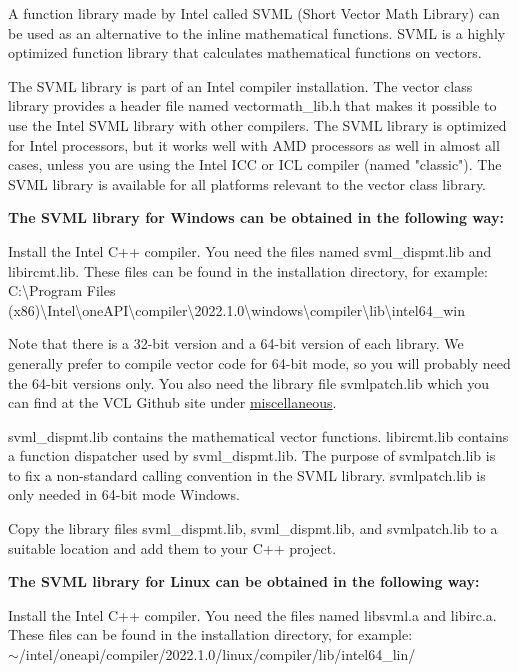 \documentclass[vcl_manual.tex]{subfiles}
\begin{document}
A function library made by Intel called SVML (Short Vector Math Library) can be used as an alternative to the inline mathematical functions. SVML is a highly optimized function library that calculates mathematical functions on vectors.

The SVML library is part of an Intel compiler installation. The vector class library provides a header file named vectormath\_lib.h that makes it possible to use the Intel SVML library with other compilers. The SVML library is optimized for Intel processors, but it works well with AMD processors as well in almost all cases, unless you are using the Intel ICC or ICL compiler (named "classic"). The SVML library is available for all platforms relevant to the vector class library.

\textbf{The SVML library for Windows can be obtained in the following way:}

Install the Intel C++ compiler. You need the files named svml\_dispmt.lib and libircmt.lib. These files can be found in the installation directory, for example:\\
C:\textbackslash Program Files (x86)\textbackslash Intel\textbackslash oneAPI\textbackslash compiler\textbackslash 2022.1.0\textbackslash windows\textbackslash compiler\textbackslash lib\textbackslash intel64\_win

Note that there is a 32-bit version and a 64-bit version of each library. We generally prefer to compile vector code for 64-bit mode, so you will probably need the 64-bit versions only. You also need the library file svmlpatch.lib which you can find at the VCL Github site under 
\href{https://github.com/vectorclass/miscellaneous/tree/master/svmlpatch}{miscellaneous}. 

svml\_dispmt.lib contains the mathematical vector functions. libircmt.lib contains a function dispatcher used by svml\_dispmt.lib. 
The purpose of svmlpatch.lib is to fix a non-standard calling convention in the SVML library. svmlpatch.lib is only needed in 64-bit mode Windows.

Copy the library files svml\_dispmt.lib, svml\_dispmt.lib, and svmlpatch.lib to a suitable location and add them to your C++ project.


\textbf{The SVML library for Linux can be obtained in the following way:}

Install the Intel C++ compiler. You need the files named libsvml.a and libirc.a. These files can be found in the installation directory, for example:\\
$\sim$/intel/oneapi/compiler/2022.1.0/linux/compiler/lib/intel64\_lin/
\end{document}
